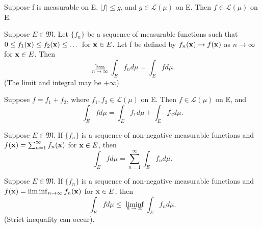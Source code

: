 \begin{theorem}
  \label{thm:chap11:integrability_domination}
  Suppose f is measurable on E, $|f| \le g$, and $g \in
  \mathcal{L}(\mu)$ on E. Then $f \in \mathcal{L}(\mu)$ on E.
\end{theorem}

\begin{theorem}
  \label{thm:chap11:monotone_convergence}
  Suppose $E \in \mathfrak{M}$. Let $\{ f_n \}$ be a sequence of
  measurable functions such that $0 \le f_1(\mathbf{x}) \le
  f_2(\mathbf{x}) \le \dots$ for $\mathbf{x} \in E$. Let f be defined by
  $f_n(\mathbf{x}) \to f(\mathbf{x})$ as $n \to \infty$ for $\mathbf{x} \in E$. Then
  \[
    \lim_{n \to \infty} \int_E f_n d\mu = \int_E f d\mu.
  \]
  (The limit and integral may be $+\infty$).
\end{theorem}

\begin{theorem}
  \label{thm:chap11:linearity_integral}
  Suppose $f = f_1 + f_2$, where $f_1, f_2 \in \mathcal{L}(\mu)$ on
  E. Then $f \in \mathcal{L}(\mu)$ on E, and
  \[
    \int_E f d\mu = \int_E f_1 d\mu + \int_E f_2 d\mu.
  \]
\end{theorem}

\begin{theorem}
  \label{thm:chap11:integration_series}
  Suppose $E \in \mathfrak{M}$. If $\{ f_n \}$ is a sequence of
  non-negative measurable functions and $f(\mathbf{x}) =
  \sum_{n=1}^\infty f_n(\mathbf{x})$ for $\mathbf{x} \in E$, then
  \[
    \int_E f d\mu = \sum_{n=1}^\infty \int_E f_n d\mu.
  \]
\end{theorem}

\begin{theorem}
  \label{thm:chap11:fatou_lemma}
  Suppose $E \in \mathfrak{M}$. If $\{ f_n \}$ is a sequence of
  non-negative measurable functions and $f(\mathbf{x}) = \liminf_{n \to
  \infty} f_n(\mathbf{x})$ for $\mathbf{x} \in E$, then
  \[
    \int_E f d\mu \le \liminf_{n \to \infty} \int_E f_n d\mu.
  \]
  (Strict inequality can occur).
\end{theorem}

